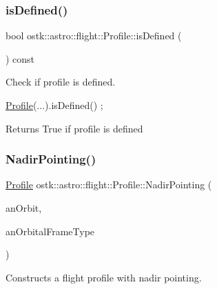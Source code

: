 \subsubsection{\texorpdfstring{is\+Defined()}{isDefined()}}
{\footnotesize\ttfamily bool ostk\+::astro\+::flight\+::\+Profile\+::is\+Defined (\begin{DoxyParamCaption}{ }\end{DoxyParamCaption}) const}



Check if profile is defined. 


\begin{DoxyCode}
\hyperlink{classostk_1_1astro_1_1flight_1_1_profile_a80fbc6a3773a6f2790b84c4ddb306d07}{Profile}(...).isDefined() ;
\end{DoxyCode}


\begin{DoxyReturn}{Returns}
True if profile is defined 
\end{DoxyReturn}
\mbox{\label{classostk_1_1astro_1_1flight_1_1_profile_ab618c70fde205ab0df2c963628223ad8}} 
\subsubsection{\texorpdfstring{Nadir\+Pointing()}{NadirPointing()}}
{\footnotesize\ttfamily \hyperlink{classostk_1_1astro_1_1flight_1_1_profile}{Profile} ostk\+::astro\+::flight\+::\+Profile\+::\+Nadir\+Pointing (\begin{DoxyParamCaption}\item[{const \hyperlink{classostk_1_1astro_1_1trajectory_1_1_orbit}{trajectory\+::\+Orbit} \&}]{an\+Orbit,  }\item[{const \hyperlink{classostk_1_1astro_1_1trajectory_1_1_orbit_a1cc449ad56374471a8ab4300dde979e7}{trajectory\+::\+Orbit\+::\+Frame\+Type} \&}]{an\+Orbital\+Frame\+Type }\end{DoxyParamCaption})\hspace{0.3cm}{\ttfamily [static]}}



Constructs a flight profile with nadir pointing. 


